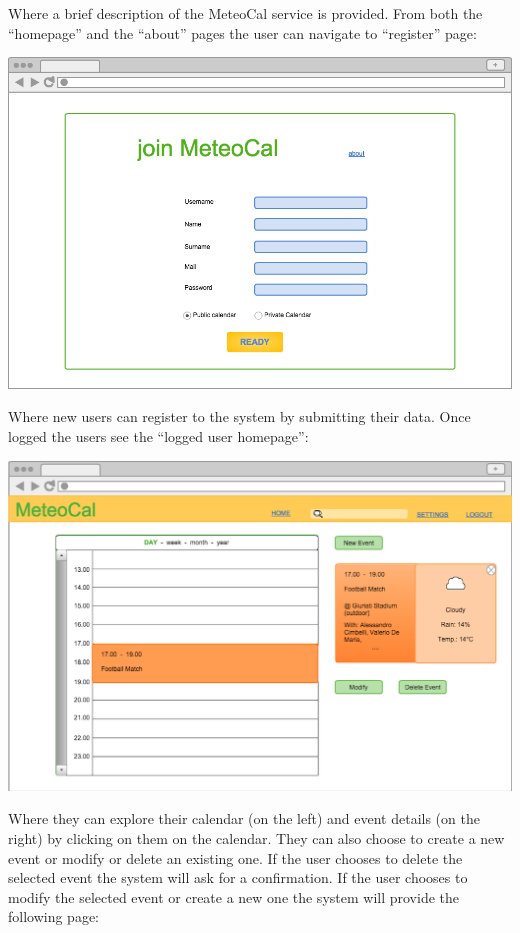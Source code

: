 \documentclass[10pt,a4paper,titlepage]{article}
\begin{document}
Where a brief description of the MeteoCal service is provided.
From both the “homepage” and the “about” pages the user can navigate to “register” page:

\vspace{3mm}\includegraphics[width={\linewidth}]{./UI_mockups/03-register.png}\vspace{3mm}

Where new users can register to the system by submitting their data.
Once logged the users see the “logged user homepage”:

\vspace{3mm}\includegraphics[width={\linewidth}]{./UI_mockups/04-registered_home.png}\vspace{3mm}

Where they can explore their calendar (on the left) and event details (on the right) by clicking on them on the calendar. They can also choose to create a new event or modify or delete an existing one.
If the user chooses to delete the selected event the system will ask for a confirmation.
If the user chooses to modify the selected event or create a new one the system will provide the following page:
\end{document}
